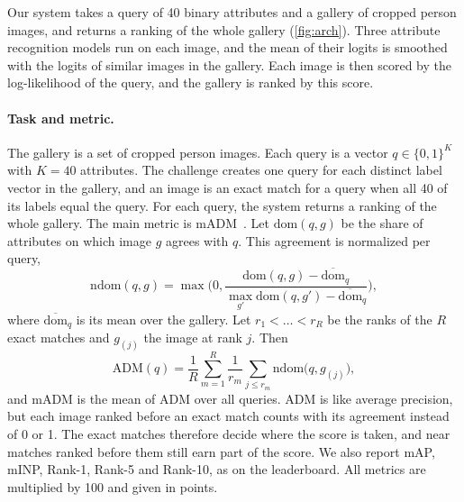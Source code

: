 \documentclass[10pt,twocolumn,letterpaper]{article}
\begin{document}
Our system takes a query of 40 binary attributes and a gallery of cropped person images, and returns a ranking of the whole gallery (\cref{fig:arch}). Three attribute recognition models run on each image, and the mean of their logits is smoothed with the logits of similar images in the gallery. Each image is then scored by the log-likelihood of the query, and the gallery is ranked by this score.

\paragraph{Task and metric.} The gallery is a set of cropped person images. Each query is a vector $q\in\{0,1\}^{K}$ with $K=40$ attributes. The challenge creates one query for each distinct label vector in the gallery, and an image is an exact match for a query when all 40 of its labels equal the query. For each query, the system returns a ranking of the whole gallery. The main metric is mADM~\cite{specker23}. Let $\mathrm{dom}(q,g)$ be the share of attributes on which image $g$ agrees with $q$. This agreement is normalized per query,
\begin{equation}
\mathrm{ndom}(q,g)=\max\Big(0,\frac{\mathrm{dom}(q,g)-\overline{\mathrm{dom}}_q}{\max_{g'}\mathrm{dom}(q,g')-\overline{\mathrm{dom}}_q}\Big),
\label{eq:ndom}
\end{equation}
where $\overline{\mathrm{dom}}_q$ is its mean over the gallery. Let $r_1<\dots<r_R$ be the ranks of the $R$ exact matches and $g_{(j)}$ the image at rank $j$. Then
\begin{equation}
\mathrm{ADM}(q)=\frac1R\sum_{m=1}^{R}\frac{1}{r_m}\sum_{j\le r_m}\mathrm{ndom}\big(q,g_{(j)}\big),
\label{eq:adm}
\end{equation}
and mADM is the mean of ADM over all queries. ADM is like average precision, but each image ranked before an exact match counts with its agreement instead of 0 or 1. The exact matches therefore decide where the score is taken, and near matches ranked before them still earn part of the score. We also report mAP, mINP, Rank-1, Rank-5 and Rank-10, as on the leaderboard. All metrics are multiplied by 100 and given in points.
\end{document}
